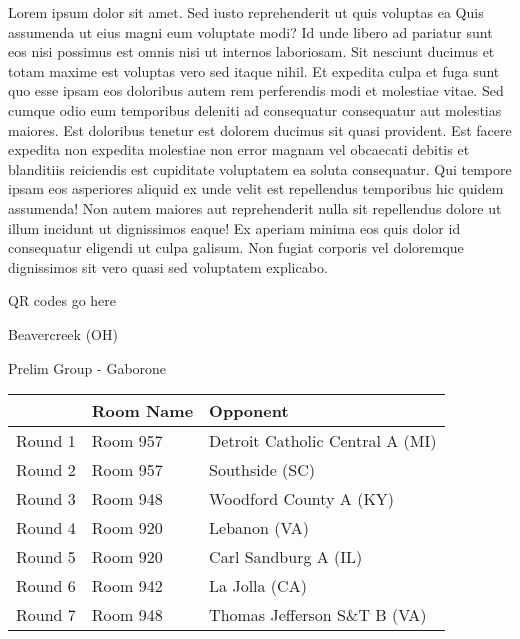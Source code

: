 \documentclass{article}%
\begin{document}
\vspace*{8pt}%
\linebreak%
\newline%
\newline%
Lorem ipsum dolor sit amet. Sed iusto reprehenderit ut quis voluptas ea Quis assumenda ut eius magni eum voluptate modi? Id unde libero ad pariatur sunt eos nisi possimus est omnis nisi ut internos laboriosam. Sit nesciunt ducimus et totam maxime est voluptas vero sed itaque nihil. Et expedita culpa et fuga sunt quo esse ipsam eos doloribus autem rem perferendis modi et molestiae vitae.\newline%
\newline%
Sed cumque odio eum temporibus deleniti ad consequatur consequatur aut molestias maiores. Est doloribus tenetur est dolorem ducimus sit quasi provident. Est facere expedita non expedita molestiae non error magnam vel obcaecati debitis et blanditiis reiciendis est cupiditate voluptatem ea soluta consequatur. Qui tempore ipsam eos asperiores aliquid ex unde velit est repellendus temporibus hic quidem assumenda!\newline%
\newline%
Non autem maiores aut reprehenderit nulla sit repellendus dolore ut illum incidunt ut dignissimos eaque! Ex aperiam minima eos quis dolor id consequatur eligendi ut culpa galisum. Non fugiat corporis vel doloremque dignissimos sit vero quasi sed voluptatem explicabo.\newline%
\newline%
%
\vspace*{30pt}%
\begin{center}%
\begin{Huge}%
QR codes go here%
\end{Huge}%
\end{center}%
\newpage%
%
\begin{center}%
\begin{Huge}%
Beavercreek (OH)%
\end{Huge}%
\vspace*{8pt}%
\linebreak%
\begin{Large}%
Prelim Group {-} Gaborone%
\end{Large}%
\end{center}%
\begin{tabularx}{\textwidth}{|c|Y|Y|}%
\hline%
&Room Name&Opponent\\%
\hline%
Round 1&Room 957&Detroit Catholic Central A (MI)\\%
Round 2&Room 957&Southside (SC)\\%
Round 3&Room 948&Woodford County A (KY)\\%
Round 4&Room 920&Lebanon (VA)\\%
Round 5&Room 920&Carl Sandburg A (IL)\\%
Round 6&Room 942&La Jolla (CA)\\%
Round 7&Room 948&Thomas Jefferson S\&T B (VA)\\%
\hline%
\end{tabularx}%
\end{document}
